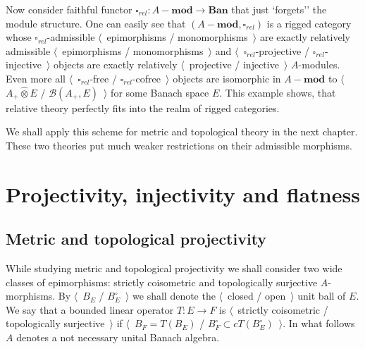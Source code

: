 \documentclass[12pt]{article}
\newcommand{\projtens}{\mathbin{\widehat{\otimes}}}
\begin{document}
Now consider faithful functor $\square_{rel}:A-\mathbf{mod}\to\mathbf{Ban}$ 
that just `forgets'' the module structure. One can easily see that
$(A-\mathbf{mod},\square_{rel})$ is a rigged category whose 
$\square_{rel}$-admissible $\langle$~epimorphisms / monomorphisms~$\rangle$ 
are exactly relatively admissible $\langle$~epimorphisms / 
monomorphisms~$\rangle$ and $\langle$~$\square_{rel}$-projective / 
$\square_{rel}$-injective~$\rangle$ objects are exactly 
relatively $\langle$~projective / injective~$\rangle$
$A$-modules. Even more all $\langle$~$\square_{rel}$-free /
$\square_{rel}$-cofree~$\rangle$ objects are isomorphic in $A-\mathbf{mod}$ to
$\langle$~$A_+\projtens E$ / $\mathcal{B}(A_+,E)$~$\rangle$ for some Banach
space $E$. This example shows, that relative theory perfectly fits into the
realm of rigged categories.

We shall apply this scheme for metric and topological theory in the next
chapter. These two theories put much weaker restrictions on their admissible
morphisms.


\section{Projectivity, injectivity and
  flatness}\label{SectionProjectivityInjectivityAndFlatness}



\subsection{Metric and topological
    projectivity}\label{SubSectionMetricAndTopologicalProjectivity}

While studying metric and topological projectivity we shall consider two wide
classes of epimorphisms: strictly coisometric and topologically surjective
$A$-morphisms. By $\langle$~$B_E$ / $B_E^\circ$~$\rangle$ we shall denote the
$\langle$~closed / open~$\rangle$ unit ball of $E$. We say that a bounded linear
operator $T:E\to F$ is $\langle$~strictly coisometric / topologically
surjective~$\rangle$ if $\langle$~$B_F=T(B_E)$ / $B_F^\circ\subset
    cT(B_E^\circ)$~$\rangle$. In what follows $A$ denotes a not necessary unital
Banach algebra.
\end{document}

